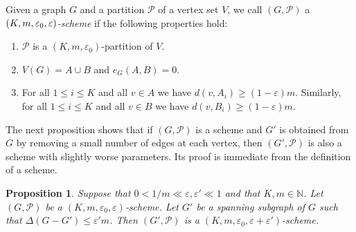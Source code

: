 \documentclass{memo-l}
\newtheorem{prop}[firstthm]{Proposition}
\def\COMMENT#1{}
\def\eps{\varepsilon}
\def\epszero{\eps_0}
\numberwithin{section}{chapter}
\numberwithin{equation}{section}
\numberwithin{firstthm}{section}
\numberwithin{figure}{section}
\begin{document}
Given a graph $G$ and a partition $\mathcal P$ of a vertex set $V$, we call $(G, \mathcal P)$ a
\emph{$(K,m,\eps _0, \break \eps )$-scheme} if the following properties hold:
\begin{enumerate}[label={(Sch{\arabic*})}]
	\item  $\mathcal P$ is a $(K,m,\eps _0)$-partition of $V$.
	\item $V(G)=A\cup B$ and $e_G(A,B)=0$.
	\item For all $1\le i \le K$ and  all $v \in A$ we have $d(v,A_i) \ge (1- \eps) m$. Similarly, for all $1\le i \le K$ and  all $v \in B$
we have $d(v,B_i) \ge (1- \eps) m$.%
	\COMMENT{Replaced superregularity with the degree condition. This implies that $G[A_i,A_{i'}]$ and $G[B_i,B_{i'}]$ are
$(\sqrt{\eps}, 1)$-superregular for all $i, i' \le K$ such that $i \ne i'$.}
\end{enumerate}

The next proposition shows that if $(G, \mathcal{P})$ is a scheme and $G'$ is obtained from $G$ by removing a small number of edges
at each vertex, then $(G', \mathcal P)$ is also a scheme with slightly worse parameters. Its proof is immediate from
the definition of a scheme.
 
\begin{prop} \label{deleteBS}
Suppose that $0 <1/m \ll\eps, \eps' \ll 1$ and that $K,m\in \mathbb{N}$.
Let $(G, \mathcal{P})$ be a $(K,  m, \epszero,\eps)$-scheme. Let $G'$ be a spanning subgraph of $G$ such that $\Delta(G- G') \le\eps' m$.
Then $(G', \mathcal P)$ is a $(K, m, \epszero, \eps + \eps')$-scheme.
\end{prop}
\end{document}
